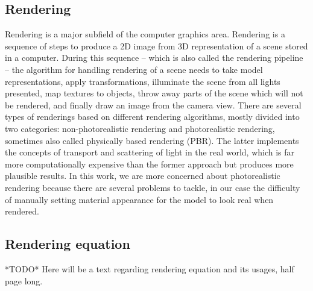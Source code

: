     \subsection{Rendering}
    Rendering is a major subfield of the computer graphics area. Rendering is a sequence of steps to produce a 2D image from 3D representation of a scene stored in a computer. During this sequence -- which is also called the rendering pipeline -- the algorithm for handling rendering of a scene needs to take model representations, apply transformations, illuminate the scene from all lights presented, map textures to objects, throw away parts of the scene which will not be rendered, and finally draw an image from the camera view. There are several types of renderings based on different rendering algorithms, mostly divided into two categories: non-photorealistic rendering and photorealistic rendering, sometimes also called physically based rendering (PBR). The latter implements the concepts of transport and scattering of light in the real world, which is far more computationally expensive than the former approach but produces more plausible results. In this work, we are more concerned about photorealistic rendering because there are several problems to tackle, in our case the difficulty of manually setting material appearance for the model to look real when rendered.
    \subsection{Rendering equation}
    *TODO* Here will be a text regarding rendering equation and its usages, half page long.
